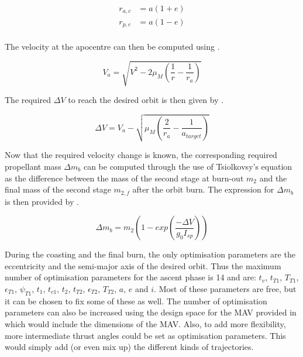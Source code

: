 
\begin{equation} \label{eq:peri_apo}
\begin{split}
r_{a,c}&=a\left(1+e\right)\\
r_{p,c}&=a\left(1-e\right)\\
\end{split}
\end{equation}

The velocity at the apocentre can then be computed using .

\begin{equation} \label{eq:vel_apo}
V_{a}=\sqrt{V^{2}-2\mu_{M}\left(\dfrac{1}{r}-\dfrac{1}{r_{a}}\right)}
\end{equation}

The required $\Delta V$ to reach the desired orbit is then given by .

\begin{equation} \label{eq:req_ini_orb}
\Delta V = V_{a}-\sqrt{\mu_{M}\left(\dfrac{2}{r_{a}}-\dfrac{1}{a_{target}}\right)}
\end{equation}

Now that the required velocity change is known, the corresponding required propellant mass $\Delta m_{b}$ can be computed through the use of Tsiolkovsy's equation as the difference between the mass of the second stage at burn-out $m_{2}$ and the final mass of the second stage $m_{2,f}$ after the orbit burn. The expression for $\Delta m_{b}$ is then provided by .


\begin{equation} \label{eq:req_propm_burn}
\Delta m_{b}=m_{2}\left(1-exp\left(\dfrac{-\Delta V}{g_{0}I_{sp}}\right)\right)
\end{equation}

During the coasting and the final burn, the only optimisation parameters are the eccentricity and the semi-major axis of the desired orbit. Thus the maximum number of optimisation parameters for the ascent phase is 14 and are: $t_{v}$, $t_{T1}$, $T_{T1}$, $\epsilon_{T1}$, $\psi_{T1}$, $t_{1}$, $t_{c1}$, $t_{2}$, $t_{T2}$, $\epsilon_{T2}$, $T_{T2}$, $a$, $e$ and $i$. Most of these parameters are free, but it can be chosen to fix some of these as well. The number of optimisation parameters can also be increased using the design space for the \ac{MAV} provided in  which would include the  dimensions of the \ac{MAV}. Also, to add more flexibility, more intermediate thrust angles could be set as optimisation parameters. This would simply add (or even mix up) the different kinds of trajectories.



